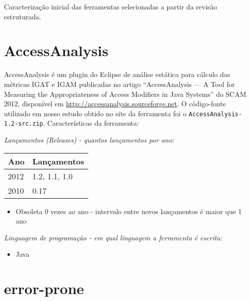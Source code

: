 {Caracterização inicial das ferramentas selecionadas a partir da revisão estruturada.}
\label{caracterizacao-ferramentas}

\section{AccessAnalysis}

AccessAnalysis é um plugin do Eclipse de análise estática 
para cálculo das métricas IGAT e IGAM
publicadas no artigo ``AccessAnalysis — A Tool for Measuring the
Appropriateness of Access Modifiers in Java Systems'' do SCAM 2012,
disponível em \url{http://accessanalysis.sourceforge.net}. O código-fonte
utilizado em nosso estudo obtido no site da ferramenta foi o
\texttt{AccessAnalysis-1.2-src.zip}. Características da ferramenta:

\begin{description}

  \item {\it Lançamentos ({\it Releases}) - quantos lançamentos por ano:}
    \begin{table}[h!]
      \centering
      \begin{tabular}{| l | l |}
        \hline
        Ano  & Lançamentos    \\
        \hline
        2012 & 1.2, 1.1, 1.0  \\
        2010 & 0.17           \\
        \hline
      \end{tabular}
    \end{table}
    \begin{itemize}
      \item Obsoleta 0 vezes ao ano - intervalo entre novos lançamentos é maior que 1 ano
    \end{itemize}

  \item {\it Linguagem de programação - em qual linguagem a ferramenta é escrita:}
    \begin{itemize}
      \item Java
    \end{itemize}

\end{description}

\section{error-prone}

